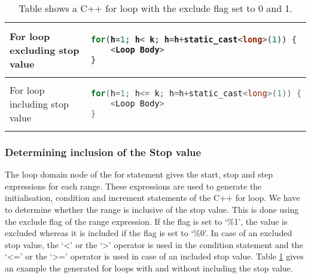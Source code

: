 \begin{table}[htbp]
\begin{tabular}{|l|l|}
\hline

For loop excluding stop value & 
{
\begin{lstlisting}[language=c,frame=none, numbers=none]
for(h=1; h< k; h=h+static_cast<long>(1)) {
	<Loop Body>
}
\end{lstlisting}
}
 \\
\hline 

For loop including stop value & 
{
\begin{lstlisting}[language=c,frame=none, numbers=none]
for(h=1; h<= k; h=h+static_cast<long>(1)) {
	<Loop Body>
}
\end{lstlisting}
} \\
\hline
\end{tabular}
\caption[Use of exclude flag in For statement]{Table shows a C++ for loop with the exclude flag set to 0 and 1.}
\label{tab:excludeFor}
\end{table}
\subsubsection{Determining inclusion of the Stop value}
The loop domain node of the for statement gives the start, stop and step expressions for each range. These expressions are used to generate the initialisation, condition and increment statements of the C++ for loop. We have to determine whether the range is  inclusive of the stop value.  This is done using the exclude flag of the range expression. If the flag is set to `\%1', the value is excluded whereas it is included if the flag is set to `\%0'. In case of an excluded stop value, the `<' or the `>' operator is used in the condition statement and the `<=' or the `>=' operator is used in case of an included stop value. Table \ref{tab:excludeFor} gives an example the generated for loops with and without including the stop value.
